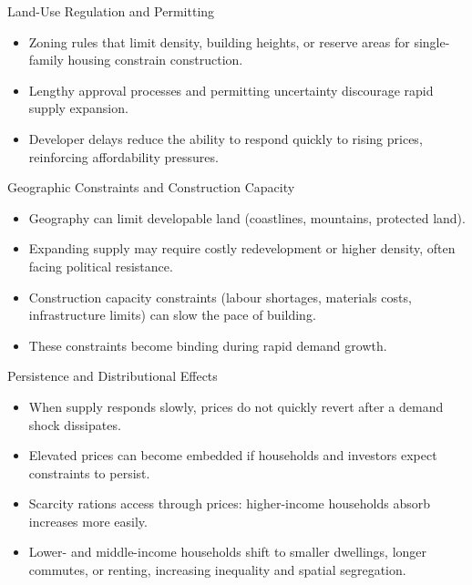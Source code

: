 \documentclass[aspectratio=169]{beamer}
\begin{document}
\begin{frame}{Land-Use Regulation and Permitting}
\transfade
\begin{itemize}
  \item Zoning rules that limit density, building heights, or reserve areas for single-family housing constrain construction.
  \item Lengthy approval processes and permitting uncertainty discourage rapid supply expansion.
  \item Developer delays reduce the ability to respond quickly to rising prices, reinforcing affordability pressures.
\end{itemize}
\end{frame}

\begin{frame}{Geographic Constraints and Construction Capacity}
\transfade
\begin{itemize}
  \item Geography can limit developable land (coastlines, mountains, protected land).
  \item Expanding supply may require costly redevelopment or higher density, often facing political resistance.
  \item Construction capacity constraints (labour shortages, materials costs, infrastructure limits) can slow the pace of building.
  \item These constraints become binding during rapid demand growth.
\end{itemize}
\end{frame}

\begin{frame}{Persistence and Distributional Effects}
\transfade
\begin{itemize}
  \item When supply responds slowly, prices do not quickly revert after a demand shock dissipates.
  \item Elevated prices can become embedded if households and investors expect constraints to persist.
  \item Scarcity rations access through prices: higher-income households absorb increases more easily.
  \item Lower- and middle-income households shift to smaller dwellings, longer commutes, or renting, increasing inequality and spatial segregation.
\end{itemize}
\end{frame}
\end{document}
